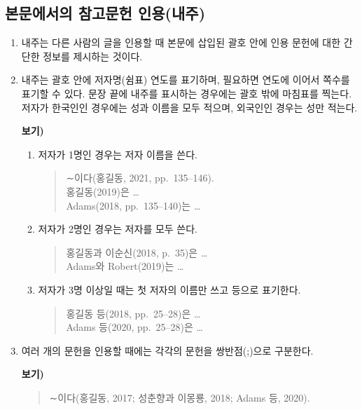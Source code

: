 \subsection{본문에서의 참고문헌 인용(내주)}

\begin{enumerate}
    \item 내주는 다른 사람의 글을 인용할 때 본문에 삽입된 괄호 안에 인용 문헌에 대한 간단한 정보를 제시하는 것이다.

    \item 내주는 괄호 안에 저자명(쉼표) 연도를 표기하며, 필요하면 연도에 이어서 쪽수를 표기할 수 있다. 문장 끝에 내주를 표시하는 경우에는 괄호 밖에 마침표를 찍는다. 저자가 한국인인 경우에는 성과 이름을 모두 적으며, 외국인인 경우는 성만 적는다.

    \textbf{보기)}
    \begin{enumerate}
        \item[가.] 저자가 1명인 경우는 저자 이름을 쓴다.
        \begin{quote}
            ∼이다(홍길동, 2021, pp.\ 135--146). \\
            홍길동(2019)은 \ldots \\
            Adams(2018, pp.\ 135--140)는 \ldots
        \end{quote}

        \item[나.] 저자가 2명인 경우는 저자를 모두 쓴다.
        \begin{quote}
            홍길동과 이순신(2018, p.\ 35)은 \ldots \\
            Adams와 Robert(2019)는 \ldots
        \end{quote}

        \item[다.] 저자가 3명 이상일 때는 첫 저자의 이름만 쓰고 등으로 표기한다.
        \begin{quote}
            홍길동 등(2018, pp.\ 25--28)은 \ldots \\
            Adams 등(2020, pp.\ 25--28)은 \ldots
        \end{quote}
    \end{enumerate}

    \item 여러 개의 문헌을 인용할 때에는 각각의 문헌을 쌍반점(;)으로 구분한다.

    \textbf{보기)}
    \begin{quote}
        ∼이다(홍길동, 2017; 성춘향과 이몽룡, 2018; Adams 등, 2020).
    \end{quote}
\end{enumerate}


